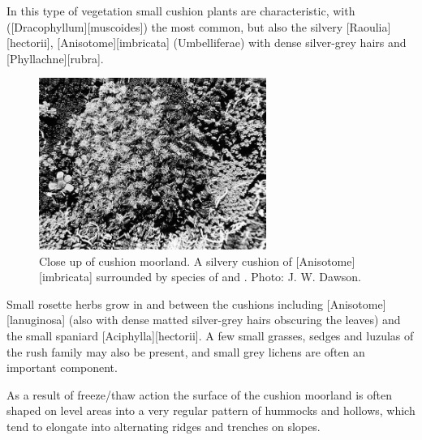 In this type of vegetation small cushion plants are characteristic, with  ([Dracophyllum][muscoides]) the most common, but also the silvery [Raoulia][hectorii], [Anisotome][imbricata] (Umbelliferae) with dense silver-grey hairs and [Phyllachne][rubra].
\begin{figure}
	\includegraphics[width=0.66\textwidth]{graphics/figure114cushion-moorland.jpg}
	\centering
	\caption[Close up of cushion moorland]{Close up of cushion moorland.
A silvery cushion of [Anisotome][imbricata] surrounded by species of  and .
	Photo: J. W. Dawson.}%
	\label{fig:114cushion-moorland}
\end{figure}
Small rosette herbs grow in and between the cushions including [Anisotome][lanuginosa] (also with dense matted silver-grey hairs obscuring the leaves) and the small spaniard [Aciphylla][hectorii].
A few small grasses, sedges and luzulas of the rush family may also be present, and small grey lichens are often an important component.

As a result of freeze/thaw action the surface of the cushion moorland is often shaped on level areas into a very regular pattern of hummocks and hollows, which tend to elongate into alternating ridges and trenches on slopes.

